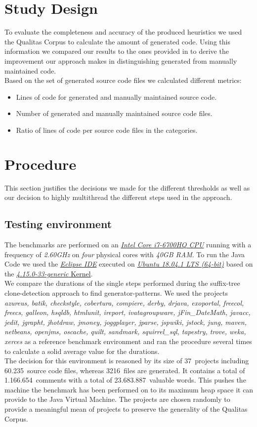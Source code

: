 \section{Study Design}
To evaluate the completeness and accuracy of the produced heuristics we used the Qualitas Corpus to calculate the amount of generated code. Using this information we compared our results to the ones provided in \cite{Bernwieser2014} to derive the improvement our approach makes in distinguishing generated from manually maintained code.\\
Based on the set of generated source code files we calculated different metrics:
\begin{itemize}
	\item Lines of code for generated and manually maintained source code.
	\item Number of generated and manually maintained source code files.
	\item Ratio of lines of code per source code files in the categories.
\end{itemize}

\section{Procedure}
This section justifies the decisions we made for the different thresholds as well as our decision to highly multithread the different steps used in the approach.

\subsection{Testing environment}
The benchmarks are performed on an \href{https://www.intel.de/}{\textit{Intel Core i7-6700HQ CPU}} running with a frequency of \textit{2.60GHz} on \textit{four} physical cores with \textit{40GB RAM}. To run the Java Code we used the \href{https://www.eclipse.org/}{\textit{Eclipse IDE}} executed on \href{https://www.ubuntu.com/}{\textit{Ubuntu 18.04.1 LTS (64-bit)}} based on the \href{https://www.ubuntu.com/}{\textit{4.15.0-33-generic} Kernel}.\\
We compare the durations of the single steps performed during the suffix-tree clone-detection approach to find generator-patterns. We used the projects \textit{azureus, batik, checkstyle, cobertura, compiere, derby, drjava, exoportal, freecol, freecs, galleon, hsqldb, htmlunit, ireport, ivatagroupware, jFin\_DateMath, javacc, jedit, jgrapht, jhotdraw, jmoney, joggplayer, jparse, jspwiki, jstock, jung, maven, netbeans, openjms, oscache, quilt, sandmark, squirrel\_sql, tapestry, trove, weka, xerces} as a reference benchmark environment and ran the procedure several times to calculate a solid average value for the durations. \\
The decision for this environment is reasoned by its size of 37~projects including 60.235~source code files, whereas 3216~files are generated. It contains a total of 1.166.654~comments with a total of 23.683.887~valuable words. This pushes the machine the benchmark has been performed on to its maximum heap space it can provide to the Java Virtual Machine. The projects are chosen randomly to provide a meaningful mean of projects to preserve the generality of the Qualitas Corpus.

